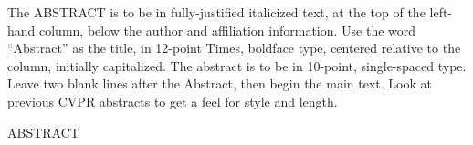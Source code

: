 \begin{abstractEn}
    The ABSTRACT is to be in fully-justified italicized text, at the top of the left-hand column, below the author and affiliation information. Use the word ``Abstract'' as the title, in 12-point Times, boldface type, centered relative to the column, initially capitalized. The abstract is to be in 10-point, single-spaced type. Leave two blank lines after the Abstract, then begin the main text. Look at previous CVPR abstracts to get a feel for style and length.
    
    \begin{keywordsEn}
        ABSTRACT
    \end{keywordsEn}
\end{abstractEn}
